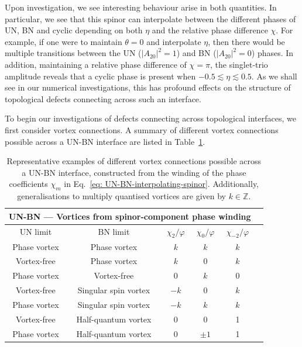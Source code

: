 Upon investigation, we see interesting behaviour arise in both quantities.
In particular, we see that this spinor can interpolate between the different
phases of UN, BN and cyclic depending on both \(\eta \) and the relative phase
difference \(\chi \).
For example, if one were to maintain \(\theta=0\) and interpolate \(\eta \),
then there would be multiple transitions between the UN (\(|A_{20}|^2 = 1\)) and
BN (\(|A_{20}|^2 = 0\)) phases.
In addition, maintaining a relative phase difference of \(\chi=\pi \), the
singlet-trio amplitude reveals that a cyclic phase is present when
\(-0.5 \lesssim \eta \lesssim 0.5\).
As we shall see in our numerical investigations, this has profound effects on
the structure of topological defects connecting across such an interface.

To begin our investigations of defects connecting across topological interfaces,
we first consider vortex connections.
A summary of different vortex connections possible across a UN-BN interface are
listed in Table~\ref{tab: UN-BN-vortices}.
\begin{table}
    \centering
    \begin{tabular}{cccccc}
        \toprule
        \multicolumn{5}{c}{UN-BN --- Vortices from spinor-component phase
        winding} \\
        \midrule
        UN limit & BN limit &  \(\chi_2/\varphi \) & \(\chi_0/\varphi \) &
        \(\chi_{-2}/\varphi \)  \\
        \midrule
        Phase vortex & Phase vortex & \(k\) & \(k\) &
         \(k\) \\ 
         Vortex-free & Phase vortex & \(k\) & 0 & \(k\) \\
        Phase vortex & Vortex-free & 0 & \(k\) & 0\\
         Vortex-free & Singular spin vortex  & \(-k\) & 0 & \(k\) \\
        Phase vortex & Singular spin vortex  & \(-k\) & \(k\) &
         \(k\) \\
         Vortex-free & Half-quantum vortex  & 0 & 0 & 1 \\
        Phase vortex & Half-quantum vortex  & 0 & \(\pm 1\) & 1 \\
        \bottomrule
    \end{tabular}
    \caption[Examples of possible vortex connections across a uniaxial nematic
    to biaxial nematic interface]{\label{tab: UN-BN-vortices}
    Representative examples of different vortex connections possible across a
    UN-BN interface, constructed from the winding of the phase coefficients
    \(\chi_m\) in Eq.~\eqref{eq: UN-BN-interpolating-spinor}.
    Additionally, generalisations to multiply quantised vortices are given by
    \(k \in \mathbb{Z}\).}
\end{table}
